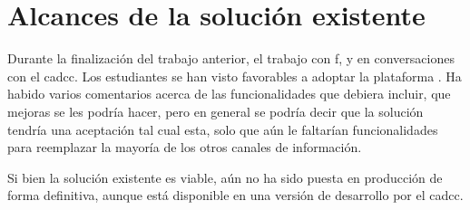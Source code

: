 \section{Alcances de la solución existente}
    \par Durante la finalización del trabajo anterior, el trabajo con \acrlong{f}, y en conversaciones con el \acrlong{cadcc}. Los estudiantes se han visto favorables a adoptar la plataforma \cite{ARANCIBIA2021}. Ha habido varios comentarios acerca de las funcionalidades que debiera incluir, que mejoras se les podría hacer, pero en general se podría decir que la solución tendría una aceptación tal cual esta, solo que aún le faltarían funcionalidades para reemplazar la mayoría de los otros canales de información.
    \par Si bien la solución existente es viable, aún no ha sido puesta en producción de forma definitiva, aunque está disponible en una versión de desarrollo por el \acrshort{cadcc}.
    
